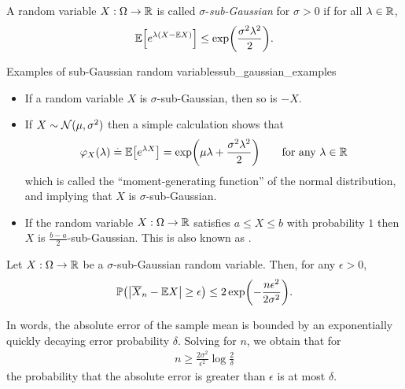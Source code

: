 \begin{defn}
  A random variable $X : \Omega \to \mathbb{R}$ is called $\sigma$-\emph{sub-Gaussian} for $\sigma > 0$ if for all $\lambda \in \mathbb{R}$, \begin{align}
    \E{e^{\lambda (X - \E*{X})}} \leq \exp\parentheses*{\frac{\sigma^2 \lambda^2}{2}}. \label{eq:sub_gaussian}
  \end{align}
\end{defn}

\begin{ex}{Examples of sub-Gaussian random variables}{sub_gaussian_examples}
  \leavevmode\begin{itemize}
    \item If a random variable $X$ is $\sigma$-sub-Gaussian, then so is $-X$.

    \item If $X \sim \N{\mu}{\sigma^2}$ then a simple calculation shows that \begin{align}
      \varphi_X(\lambda) \defeq \E{e^{\lambda X}} = \exp\parentheses*{\mu \lambda + \frac{\sigma^2 \lambda^2}{2}} \qquad\text{for any $\lambda \in \R$} \label{eq:mgf_univ_gaussian}
    \end{align} which is called the ``moment-generating function'' of the normal distribution, and implying that $X$ is $\sigma$-sub-Gaussian.

    \item If the random variable $X : \Omega \to \mathbb{R}$ satisfies $a \leq X \leq b$ with probability $1$ then $X$ is $\frac{b-a}{2}$-sub-Gaussian.
    This is also known as .
  \end{itemize}
\end{ex}

\begin{thmb}
  \begin{thm}\label{thm:hoeffdings_inequality}
    Let $X : \Omega \to \mathbb{R}$ be a $\sigma$-sub-Gaussian random variable.
    Then, for any $\epsilon > 0$, \begin{align}
      \Pr{\abs{\mean{X}_n - \E*{X}} \geq \epsilon} \leq 2 \exp\parentheses*{-\frac{n \epsilon^2}{2 \sigma^2}}. \label{eq:hoeffdings_inequality}
    \end{align}
  \end{thm}
\end{thmb}

In words, the absolute error of the sample mean is bounded by an exponentially quickly decaying error probability $\delta$.
Solving for $n$, we obtain that for \begin{align}
  n \geq \frac{2 \sigma^2}{\epsilon^2} \log \frac{2}{\delta} \label{eq:eq:hoeffdings_inequality_sample_size}
\end{align} the probability that the absolute error is greater than $\epsilon$ is at most $\delta$.

